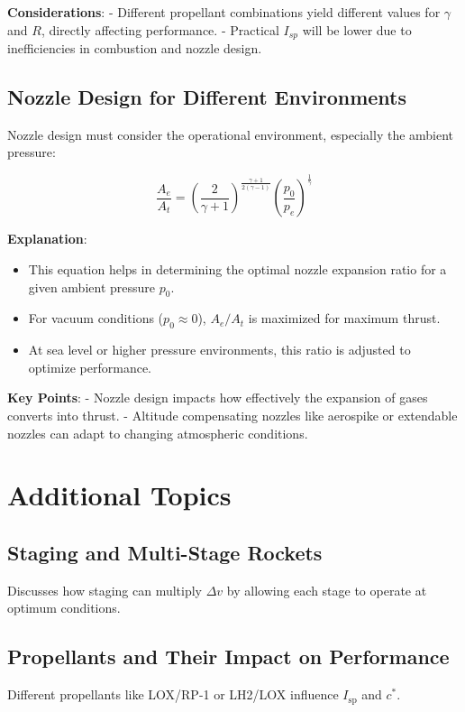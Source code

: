 \documentclass[12pt]{report}
\begin{document}
\textbf{Considerations}:
- Different propellant combinations yield different values for $\gamma$ and $R$, directly affecting performance.
- Practical $I_{sp}$ will be lower due to inefficiencies in combustion and nozzle design.

\subsection{Nozzle Design for Different Environments}
Nozzle design must consider the operational environment, especially the ambient pressure:

\begin{equation}
\frac{A_e}{A_t} = \left(\frac{2}{\gamma+1}\right)^{\frac{\gamma+1}{2(\gamma-1)}} \left(\frac{p_0}{p_e}\right)^{\frac{1}{\gamma}} \label{eq:optimal_expansion_environment}
\end{equation}

\textbf{Explanation}:
\begin{itemize}
    \item This equation helps in determining the optimal nozzle expansion ratio for a given ambient pressure $p_0$.
    \item For vacuum conditions ($p_0 \approx 0$), $A_e/A_t$ is maximized for maximum thrust.
    \item At sea level or higher pressure environments, this ratio is adjusted to optimize performance.
\end{itemize}

\textbf{Key Points}:
- Nozzle design impacts how effectively the expansion of gases converts into thrust.
- Altitude compensating nozzles like aerospike or extendable nozzles can adapt to changing atmospheric conditions.

\section{Additional Topics}

\subsection{Staging and Multi-Stage Rockets}
Discusses how staging can multiply $\Delta v$ by allowing each stage to operate at optimum conditions.

\subsection{Propellants and Their Impact on Performance}
Different propellants like LOX/RP-1 or LH2/LOX influence $I_{\text{sp}}$ and $c^*$.
\end{document}
